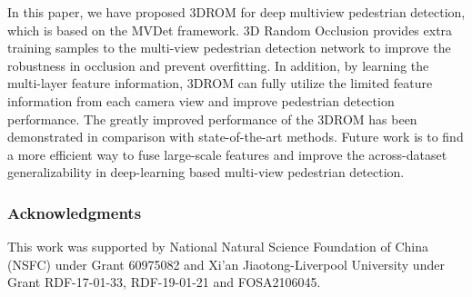 \documentclass[runningheads]{llncs}
\begin{document}
	In this paper, we have proposed 3DROM for deep multiview pedestrian detection, which is based on the MVDet framework. 3D Random Occlusion provides extra training samples to the multi-view pedestrian detection network to improve the robustness in occlusion and prevent overfitting. In addition, by learning the multi-layer feature information, 3DROM can fully utilize the limited feature information from each camera view and improve pedestrian detection performance. The greatly improved performance of the 3DROM has been demonstrated in comparison with state-of-the-art methods. Future work is to find a more efficient way to fuse large-scale features and improve the across-dataset generalizability in deep-learning based multi-view pedestrian detection.
	
	\subsubsection{Acknowledgments}
	This work was supported by National Natural Science Foundation of China (NSFC) under Grant 60975082 and Xi'an Jiaotong-Liverpool University under Grant RDF-17-01-33, RDF-19-01-21 and FOSA2106045.

	\clearpage

	
\end{document}
